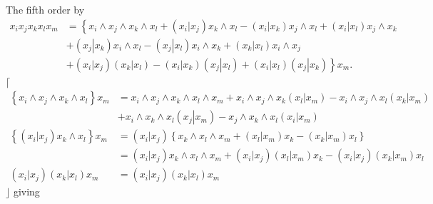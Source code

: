 \documentclass[aps, preprint]{revtex4}
\begin{document}
The fifth order by
\begin{align}x_{i} x_{j} x_{k} x_{l} x_{m} &  =\left \{x_{i} \wedge x_{j} \wedge x_{k} \wedge x_{l} +\left (\left .x_{i}\right \vert x_{j}\right ) x_{k} \wedge x_{l} -\left (\left .x_{i}\right \vert x_{k}\right ) x_{j} \wedge x_{l} +\left (\left .x_{i}\right \vert x_{l}\right ) x_{j} \wedge x_{k}\right . \nonumber  \\
 &  +\left (\left .x_{j}\right \vert x_{k}\right ) x_{i} \wedge x_{l} -\left (\left .x_{j}\right \vert x_{l}\right ) x_{i} \wedge x_{k} +\left (\left .x_{k}\right \vert x_{l}\right ) x_{i} \wedge x_{j} \nonumber  \\
 &  +\left .\left (\left .x_{i}\right \vert x_{j}\right ) \left (\left .x_{k}\right \vert x_{l}\right ) -\left (\left .x_{i}\right \vert x_{k}\right ) \left (\left .x_{j}\right \vert x_{l}\right ) +\left (\left .x_{i}\right \vert x_{l}\right ) \left (\left .x_{j}\right \vert x_{k}\right )\right \} x_{m}\text{.}\end{align}$\lceil $
\begin{align}\left \{x_{i} \wedge x_{j} \wedge x_{k} \wedge x_{l}\right \}x_{m} &  =x_{i} \wedge x_{j} \wedge x_{k} \wedge x_{l} \wedge x_{m} +x_{i} \wedge x_{j} \wedge x_{k} \left (\left .x_{l}\right \vert x_{m}\right ) -x_{i} \wedge x_{j} \wedge x_{l} \left (\left .x_{k}\right \vert x_{m}\right ) \nonumber  \\
 &  +x_{i} \wedge x_{k} \wedge x_{l} \left (\left .x_{j}\right \vert x_{m}\right ) -x_{j} \wedge x_{k} \wedge x_{l} \left (\left .x_{i}\right \vert x_{m}\right ) \nonumber  \\
\left \{\left (\left .x_{i}\right \vert x_{j}\right ) x_{k} \wedge x_{l}\right \}x_{m} &  =\left (\left .x_{i}\right \vert x_{j}\right ) \left \{x_{k} \wedge x_{l} \wedge x_{m} +\left (\left .x_{l}\right \vert x_{m}\right ) x_{k} -\left (\left .x_{k}\right \vert x_{m}\right ) x_{l}\right \} \nonumber  \\
 &  =\left (\left .x_{i}\right \vert x_{j}\right ) x_{k} \wedge x_{l} \wedge x_{m} +\left (\left .x_{i}\right \vert x_{j}\right ) \left (\left .x_{l}\right \vert x_{m}\right ) x_{k} -\left (\left .x_{i}\right \vert x_{j}\right ) \left (\left .x_{k}\right \vert x_{m}\right ) x_{l} \nonumber  \\
\left (\left .x_{i}\right \vert x_{j}\right ) \left (\left .x_{k}\right \vert x_{l}\right ) x_{m} &  =\left (\left .x_{i}\right \vert x_{j}\right ) \left (\left .x_{k}\right \vert x_{l}\right ) x_{m}\end{align}$\rfloor $ giving
\end{document}
